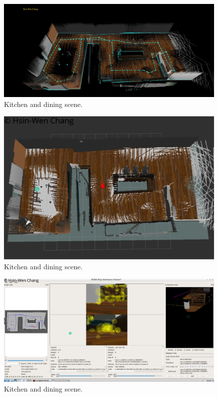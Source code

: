 \documentclass[10pt,journal,compsoc]{IEEEtran}
\begin{document}
\begin{figure}[thpb]
      \centering
      \includegraphics[width=\linewidth]{suppliedEnvironment.png}
      \caption{Kitchen and dining scene.}
      \label{fig:robot1}
\end{figure}
\begin{figure}[thpb]
      \centering
      \includegraphics[width=\linewidth]{rvizMapping.png}
      \caption{Kitchen and dining scene.}
      \label{fig:robot1}
\end{figure}
\begin{figure}[thpb]
      \centering
      \includegraphics[width=\linewidth]{databaseViewer.png}
      \caption{Kitchen and dining scene.}
      \label{fig:robot1}
\end{figure}
\end{document}
